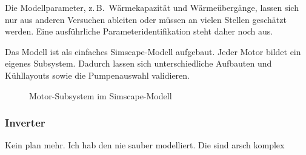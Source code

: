 Die Modellparameter, z.\,B.\ Wärmekapazität und Wärmeübergänge, lassen sich
nur aus anderen Versuchen ableiten oder müssen an vielen Stellen geschätzt
werden. Eine ausführliche Parameteridentifikation steht daher noch aus.

Das Modell ist als einfaches Simscape-Modell aufgebaut. Jeder Motor bildet ein
eigenes Subsystem. Dadurch lassen sich unterschiedliche Aufbauten und
Kühllayouts sowie die Pumpenauswahl validieren.

\begin{figure}[htbp]
    \centering
    \caption{Motor-Subsystem im Simscape-Modell}
    \label{fig:motor_subsystem}
\end{figure}

\subsubsection{Inverter}
Kein plan mehr. Ich hab den nie sauber modelliert. Die sind arsch komplex

